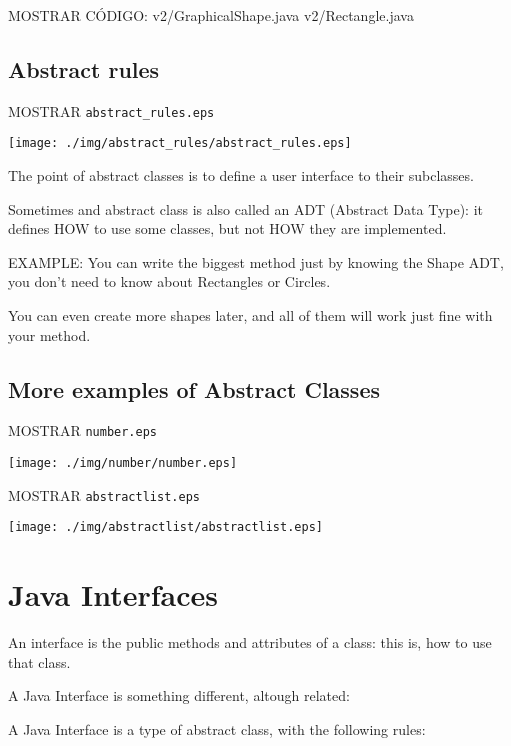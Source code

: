 \documentclass[a4paper, 9pt]{extarticle}
\begin{document}
\begin{blackboard}
MOSTRAR CÓDIGO:
  v2/GraphicalShape.java
  v2/Rectangle.java
\end{blackboard}


\subsection{Abstract rules}

MOSTRAR \verb+abstract_rules.eps+
\begin{center}
  \texttt{[image: ./img/abstract\_rules/abstract\_rules.eps]}
\end{center}

The point of abstract classes is to define a user interface to their subclasses.

Sometimes and abstract class is also called an ADT (Abstract Data Type): it
defines HOW to use some classes, but not HOW they are implemented.

EXAMPLE: You can write the biggest method just by knowing the Shape ADT, you
don't need to know about Rectangles or Circles.

You can even create more shapes later, and all of them will work just fine with
your method.




\subsection{More examples of Abstract Classes}

MOSTRAR \verb+number.eps+
\begin{center}
  \texttt{[image: ./img/number/number.eps]}
\end{center}

MOSTRAR \verb+abstractlist.eps+
\begin{center}
  \texttt{[image: ./img/abstractlist/abstractlist.eps]}
\end{center}


\section{Java Interfaces}

An interface is the public methods and attributes of a class: this is, how to
use that class.

A Java Interface is something different, altough related:

A Java Interface is a type of abstract class, with the following rules:
\end{document}
